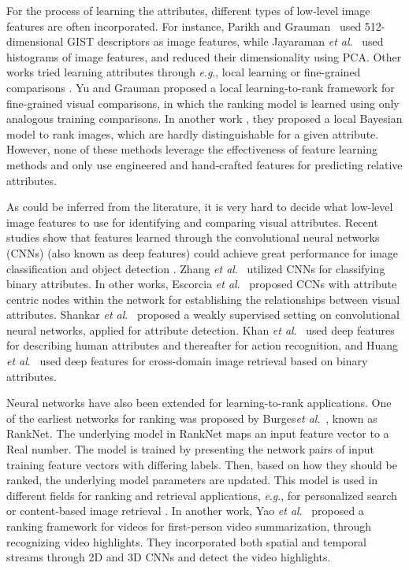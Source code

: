 \documentclass[runningheads]{llncs}
\newcommand{\etal}{\textit{et al}.}
\newcommand{\eg}{\textit{e}.\textit{g}.}
\begin{document}
For the process of learning the attributes, different types of low-level image features are often  incorporated. For instance, Parikh and Grauman~\cite{parikh2011} used 512-dimensional GIST \cite{Aude01} descriptors as image features, while Jayaraman \etal~\cite{6909607} used histograms of image features, and reduced their dimensionality using PCA. Other works tried learning attributes through \eg, local learning \cite{1641014} or fine-grained comparisons \cite{Yu2014}. Yu and Grauman \cite{Yu2014} proposed a local learning-to-rank framework for fine-grained visual comparisons, in which the ranking model is learned using only analogous training comparisons. In another work \cite{Yu2015}, they proposed a local Bayesian model to rank images, which are hardly distinguishable for a given attribute. However, none of these methods leverage the effectiveness of feature learning methods and only use engineered and hand-crafted features for predicting relative attributes. %

As could be inferred from the literature, it is very hard to decide what low-level image features to use for identifying and comparing visual attributes. Recent studies show that features learned through the convolutional neural networks (CNNs) \cite{LeCun1989HandwrittenDR} (also known as deep features) could achieve great performance for image classification \cite{Krizhevsky2012ImageNetCW} and object detection \cite{6909475}. Zhang \etal~\cite{6909608} utilized CNNs for classifying binary attributes. In other works, Escorcia \etal~\cite{Escorcia_2015_CVPR} proposed CCNs with attribute centric nodes within the network for establishing the relationships between visual attributes. Shankar \etal~\cite{Shankar_2015_CVPR} proposed a weakly supervised setting on convolutional neural networks, applied for attribute detection. Khan \etal~\cite{khan15} used deep features for describing human attributes and thereafter for action recognition, and Huang \etal~\cite{Huang_2015_ICCV} used deep features for cross-domain image retrieval based on binary attributes.  

Neural networks have also been extended for learning-to-rank applications. One of the earliest networks for ranking was proposed by Burges\etal~\cite{Burges2005}, known as RankNet. The underlying model in RankNet maps an input feature vector to a Real number. The model is trained  by presenting the network pairs of input training feature vectors with differing labels. Then, based on how they should be ranked, the underlying model parameters are updated. This model is used in different fields for ranking and retrieval applications, \eg, for personalized search \cite{song2014} or content-based image retrieval \cite{Wan2014}. In another work, Yao \etal~\cite{YaoCVPR2016} proposed a ranking framework for videos for first-person
video summarization, through recognizing video highlights. They incorporated both spatial and temporal streams through 2D and 3D CNNs and detect the video highlights.
\end{document}
